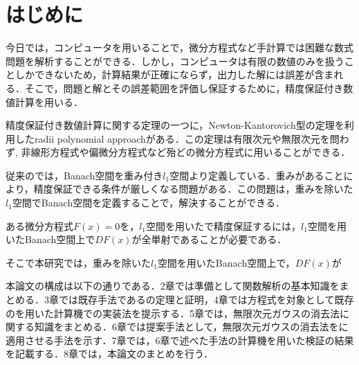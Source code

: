\chapter{はじめに}

今日では，コンピュータを用いることで，微分方程式など手計算では困難な数式問題を解析することができる．しかし，コンピュータは有限の数値のみを扱うことしかできないため，計算結果が正確にならず，出力した解には誤差が含まれる．そこで，問題と解とその誤差範囲を評価し保証するために，精度保証付き数値計算を用いる\cite{b1}．

精度保証付き数値計算に関する定理の一つに，Newton-Kantorovich型の定理を利用したradii polynomial approachがある．この定理は有限次元や無限次元を問わず, 非線形方程式や偏微分方程式など殆どの微分方程式に用いることができる．

従来の\rad{}では，Banach空間を重み付き$l_1$空間より定義している．重みがあることにより，精度保証できる条件が厳しくなる問題がある．この問題は，重みを除いた$l_1$空間でBanach空間を定義することで，解決することができる．

ある微分方程式$F(x)=0$を，$l_1$空間を用いた\rad{}で精度保証するには，$l_1$空間を用いたBanach空間上で$DF(x)$が全単射であることが必要である．

そこで本研究では，重みを除いた$l_1$空間を用いたBanach空間上で，$DF(x)$が

本論文の構成は以下の通りである．2章では準備として関数解析の基本知識をまとめる．3章では既存手法である\rad{}の定理と証明，4章では\vdp{}方程式を対象として既存の\rad{}を用いた計算機での実装法を提示する．5章では，無限次元ガウスの消去法に関する知識をまとめる．6章では提案手法として，無限次元ガウスの消去法を\rad{}に適用させる手法を示す．7章では，6章で述べた手法の計算機を用いた検証の結果を記載する．8章では，本論文のまとめを行う．

\begin{comment}
\hrulefill

精度保証付き数値計算における重要な定理の一つに，nk型の定理を利用したradがある．この定理は，有限次元から無限次元まで幅広い問題に適用可能であり，非線形方程式や偏微分方程式など，様々な微分方程式の解の存在証明に利用されている．

しかし，従来のradには改善の余地が存在する．従来手法では，ノルム空間の定義に重み付きl1空間を採用しているが，これは通常のl1空間と比較して定理の適用範囲を制限する要因となっている．この制限は，特に[具体的な例や状況]において顕著である．

\hrulefill
\end{comment}
